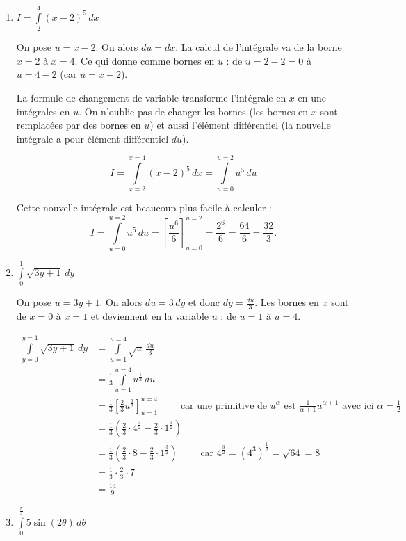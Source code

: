\documentclass[11pt,class=report,crop=false]{standalone}
\begin{document}
\sauteligne
\begin{enumerate}
  \item $I = \int \limits _{2} ^{4} (x-2)^{5}\,dx$
  
  On pose $u= x-2$. On alors $du = dx$.
  La calcul de l'intégrale va de la borne $x=2$ à $x=4$.
  Ce qui donne comme bornes en $u$ : de $u=2-2=0$ à $u=4-2$ (car $u=x-2$).

  La formule de changement de variable transforme l'intégrale en $x$ en une intégrales en $u$.
  On n'oublie pas de changer les bornes (les bornes en $x$ sont remplacées par des bornes en $u$) et aussi l'élément différentiel (la nouvelle intégrale a pour élément différentiel $du$).
  
  $$I = \int \limits _{x=2} ^{x=4} (x-2)^{5}\,dx
  = \int \limits _{u=0} ^{u=2} u^{5}\,du$$
  
  Cette nouvelle intégrale est beaucoup plus facile à calculer :
  $$I = \int \limits _{u=0} ^{u=2} u^{5}\,du = \left[ \frac{u^6}{6} \right]_{u=0} ^{u=2} = \frac{2^6}{6} = \frac{64}{6} = \frac{32}{3}.$$
  

  \item $\int \limits _{0} ^{1} \sqrt{3y+1}\, dy$
  
  On pose $u= 3y+1$. On alors $du = 3\,dy$ et donc $dy = \frac{du}{3}$.
  Les bornes en $x$ sont de $x=0$ à $x=1$ et deviennent en la variable $u$ : de $u=1$ à $u=4$.
  
  \begin{align*}
  	\int \limits _{y=0} ^{y=1} \sqrt{3y+1}\, dy
   &= \int \limits _{u=1} ^{u=4} \sqrt{u}\,\frac{du}{3} \\
   &= \frac13\int \limits _{u=1} ^{u=4} u^{\frac12} \,du \\
   &= \frac13\left[ \frac23u^{\frac32} \right]_{u=1} ^{u=4} \qquad \text{ car une primitive de $u^\alpha$ est $\frac1{\alpha+1} u^{\alpha +1 }$ avec ici $\alpha=\frac12$} \\
   &= \frac13 \left(\frac23 \cdot 4^{\frac32}-\frac23 \cdot 1^{\frac32} \right) \\
   &= \frac13 \left(\frac23 \cdot 8-\frac23 \cdot 1^{\frac32} \right)\qquad \text{ car $4^{\frac32} = (4^3)^\frac12 = \sqrt{64} = 8$} \\
   &= \frac13 \cdot \frac23 \cdot 7 \\
   &= \frac{14}9
   \end{align*}

   \item $\int \limits _{0} ^{\frac{\pi}{4}} 5\sin(2\theta) \,d\theta$ 
   

\end{enumerate}
\end{document}
